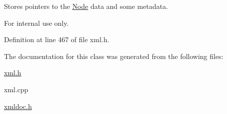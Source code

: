 Stores pointers to the \hyperlink{classphys_1_1xml_1_1Node}{Node} data and some metadata. 

\begin{DoxyInternal}{For internal use only.}
\end{DoxyInternal}


Definition at line 467 of file xml.h.



The documentation for this class was generated from the following files:\begin{DoxyCompactItemize}
\item 
\hyperlink{xml_8h}{xml.h}\item 
xml.cpp\item 
\hyperlink{xmldoc_8h}{xmldoc.h}\end{DoxyCompactItemize}
